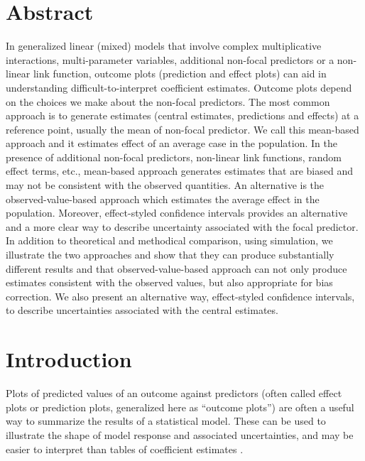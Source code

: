 \section*{Abstract}


In generalized linear (mixed) models that involve complex multiplicative interactions, multi-parameter variables, additional non-focal predictors or a non-linear link function, outcome plots (prediction and effect plots) can aid in understanding difficult-to-interpret coefficient estimates. Outcome plots depend on the choices we make about the non-focal predictors.
The most common approach is to generate estimates (central estimates, predictions and effects) at a reference point, usually the mean of non-focal predictor. We call this mean-based approach and it estimates effect of an average case in the population. In the presence of additional non-focal predictors, non-linear link functions, random effect terms, etc., mean-based approach generates estimates that are biased and may not be consistent with the observed quantities. An alternative is the observed-value-based approach which estimates the average effect in the population. Moreover, effect-styled confidence intervals provides an alternative and a more clear way to describe uncertainty associated with the focal predictor. In addition to theoretical and methodical comparison, using simulation, we illustrate the two approaches and show that they can produce substantially different results and that observed-value-based approach can not only produce estimates consistent with the observed values, but also appropriate for bias correction. We also present an alternative way, effect-styled confidence intervals, to describe uncertainties associated with the central estimates.


\section{Introduction}

Plots of predicted values of an outcome against predictors (often called effect plots or prediction plots, generalized here as “outcome plots”) are often a useful way to summarize the results of a statistical model. These can be used to illustrate the shape of model response and associated uncertainties, and may be easier to interpret than tables of coefficient estimates \citep{brambor_understanding_2006, berry_improving_2012, leeper2017interpreting}. 

